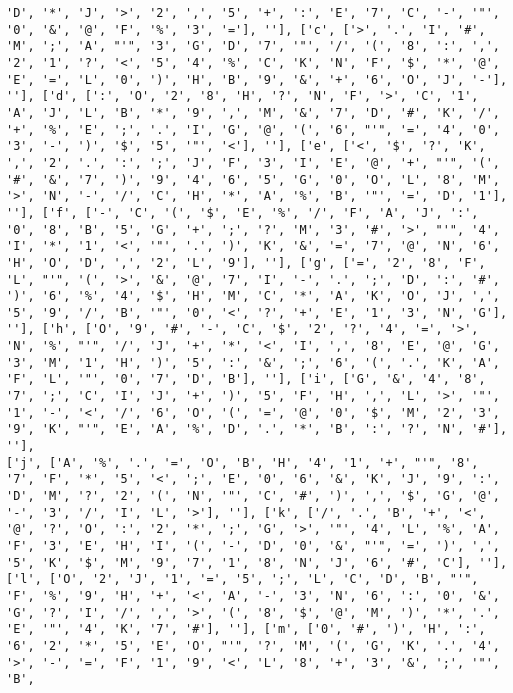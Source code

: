 \documentclass{article}
\begin{document}
\begin{verbatim}
'D', '*', 'J', '>', '2', ',', '5', '+', ':', 'E', '7', 'C', '-', '"', '0', '&', '@', 'F', '%', '3', '='], ''], ['c', ['>', '.', 'I', '#', 'M', ';', 'A', "'", '3', 'G', 'D', '7', '"', '/', '(', '8', ':', ',', '2', '1', '?', '<', '5', '4', '%', 'C', 'K', 'N', 'F', '$', '*', '@', 'E', '=', 'L', '0', ')', 'H', 'B', '9', '&', '+', '6', 'O', 'J', '-'], ''], ['d', [':', 'O', '2', '8', 'H', '?', 'N', 'F', '>', 'C', '1', 'A', 'J', 'L', 'B', '*', '9', ',', 'M', '&', '7', 'D', '#', 'K', '/', '+', '%', 'E', ';', '.', 'I', 'G', '@', '(', '6', "'", '=', '4', '0', '3', '-', ')', '$', '5', '"', '<'], ''], ['e', ['<', '$', '?', 'K', ',', '2', '.', ':', ';', 'J', 'F', '3', 'I', 'E', '@', '+', "'", '(', '#', '&', '7', ')', '9', '4', '6', '5', 'G', '0', 'O', 'L', '8', 'M', '>', 'N', '-', '/', 'C', 'H', '*', 'A', '%', 'B', '"', '=', 'D', '1'], ''], ['f', ['-', 'C', '(', '$', 'E', '%', '/', 'F', 'A', 'J', ':', '0', '8', 'B', '5', 'G', '+', ';', '?', 'M', '3', '#', '>', "'", '4', 'I', '*', '1', '<', '"', '.', ')', 'K', '&', '=', '7', '@', 'N', '6', 'H', 'O', 'D', ',', '2', 'L', '9'], ''], ['g', ['=', '2', '8', 'F', 'L', "'", '(', '>', '&', '@', '7', 'I', '-', '.', ';', 'D', ':', '#', ')', '6', '%', '4', '$', 'H', 'M', 'C', '*', 'A', 'K', 'O', 'J', ',', '5', '9', '/', 'B', '"', '0', '<', '?', '+', 'E', '1', '3', 'N', 'G'], ''], ['h', ['O', '9', '#', '-', 'C', '$', '2', '?', '4', '=', '>', 'N', '%', "'", '/', 'J', '+', '*', '<', 'I', ',', '8', 'E', '@', 'G', '3', 'M', '1', 'H', ')', '5', ':', '&', ';', '6', '(', '.', 'K', 'A', 'F', 'L', '"', '0', '7', 'D', 'B'], ''], ['i', ['G', '&', '4', '8', '7', ';', 'C', 'I', 'J', '+', ')', '5', 'F', 'H', ',', 'L', '>', '"', '1', '-', '<', '/', '6', 'O', '(', '=', '@', '0', '$', 'M', '2', '3', '9', 'K', "'", 'E', 'A', '%', 'D', '.', '*', 'B', ':', '?', 'N', '#'], ''], 
['j', ['A', '%', '.', '=', 'O', 'B', 'H', '4', '1', '+', "'", '8', '7', 'F', '*', '5', '<', ';', 'E', '0', '6', '&', 'K', 'J', '9', ':', 'D', 'M', '?', '2', '(', 'N', '"', 'C', '#', ')', ',', '$', 'G', '@', '-', '3', '/', 'I', 'L', '>'], ''], ['k', ['/', '.', 'B', '+', '<', '@', '?', 'O', ':', '2', '*', ';', 'G', '>', '"', '4', 'L', '%', 'A', 'F', '3', 'E', 'H', 'I', '(', '-', 'D', '0', '&', "'", '=', ')', ',', '5', 'K', '$', 'M', '9', '7', '1', '8', 'N', 'J', '6', '#', 'C'], ''], ['l', ['O', '2', 'J', '1', '=', '5', ';', 'L', 'C', 'D', 'B', "'", 'F', '%', '9', 'H', '+', '<', 'A', '-', '3', 'N', '6', ':', '0', '&', 'G', '?', 'I', '/', ',', '>', '(', '8', '$', '@', 'M', ')', '*', '.', 'E', '"', '4', 'K', '7', '#'], ''], ['m', ['0', '#', ')', 'H', ':', '6', '2', '*', '5', 'E', 'O', "'", '?', 'M', '(', 'G', 'K', '.', '4', '>', '-', '=', 'F', '1', '9', '<', 'L', '8', '+', '3', '&', ';', '"', 'B', 

\end{verbatim}
\end{document}
